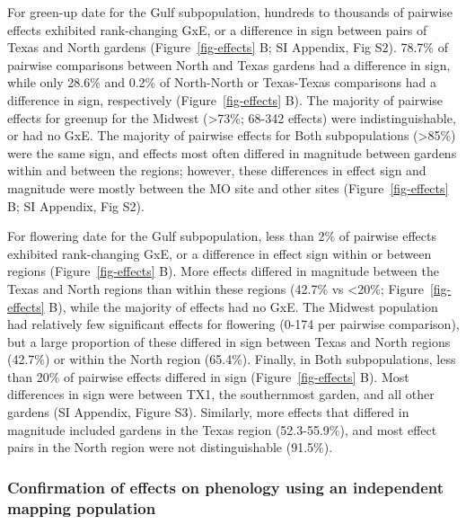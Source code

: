 \documentclass[
  9pt,
  twocolumn,
  twoside]{pnas-new}
\begin{document}
For green-up date for the Gulf subpopulation, hundreds to thousands of
pairwise effects exhibited rank-changing GxE, or a difference in sign
between pairs of Texas and North gardens (Figure~\ref{fig-effects} B; SI
Appendix, Fig S2). 78.7\% of pairwise comparisons between North and
Texas gardens had a difference in sign, while only 28.6\% and 0.2\% of
North-North or Texas-Texas comparisons had a difference in sign,
respectively (Figure~\ref{fig-effects} B). The majority of pairwise
effects for greenup for the Midwest (\textgreater73\%; 68-342 effects)
were indistinguishable, or had no GxE. The majority of pairwise effects
for Both subpopulations (\textgreater85\%) were the same sign, and
effects most often differed in magnitude between gardens within and
between the regions; however, these differences in effect sign and
magnitude were mostly between the MO site and other sites
(Figure~\ref{fig-effects} B; SI Appendix, Fig S2).

For flowering date for the Gulf subpopulation, less than 2\% of pairwise
effects exhibited rank-changing GxE, or a difference in effect sign
within or between regions (Figure~\ref{fig-effects} B). More effects
differed in magnitude between the Texas and North regions than within
these regions (42.7\% vs \textless20\%; Figure~\ref{fig-effects} B),
while the majority of effects had no GxE. The Midwest population had
relatively few significant effects for flowering (0-174 per pairwise
comparison), but a large proportion of these differed in sign between
Texas and North regions (42.7\%) or within the North region (65.4\%).
Finally, in Both subpopulations, less than 20\% of pairwise effects
differed in sign (Figure~\ref{fig-effects} B). Most differences in sign
were between TX1, the southernmost garden, and all other gardens (SI
Appendix, Figure S3). Similarly, more effects that differed in magnitude
included gardens in the Texas region (52.3-55.9\%), and most effect
pairs in the North region were not distinguishable (91.5\%).

\subsubsection{Confirmation of effects on phenology using an independent
mapping
population}\label{confirmation-of-effects-on-phenology-using-an-independent-mapping-population}
\end{document}
